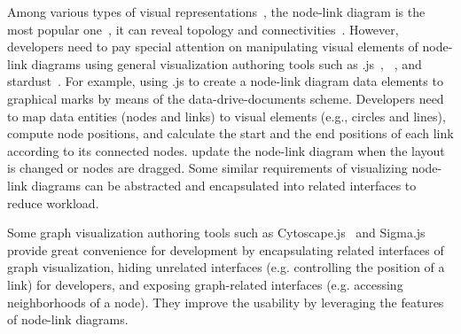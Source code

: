     Among various types of visual representations~\cite{DBLP:journals/tvcg/HermanMM00}, the node-link diagram is the most popular one~\cite{pan2020rcanalyzer},  it can reveal topology and connectivities~\cite{ghoniem2004comparison}.
    However, developers need to pay special attention on manipulating  visual elements of node-link diagrams using general visualization authoring tools such as .js~\cite{DBLP:journals/tvcg/BostockOH11}, ~\cite{p4,DBLP:journals/tvcg/LiM20,p6}, and stardust~\cite{DBLP:journals/cgf/RenLH17}.
    For example, using .js to create a node-link diagram  data elements to graphical marks by means of the data-drive-documents scheme. 
    Developers need to map data entities (nodes and links) to visual elements (e.g., circles and lines), compute node positions, and calculate the start and the end positions of each link according to its connected nodes.
     update the node-link diagram when the layout is changed\deleted[id=kg]{,} or  nodes are dragged.
    Some similar requirements of visualizing node-link diagrams can be abstracted and encapsulated into related interfaces to reduce workload.
    
    Some graph visualization authoring tools such as Cytoscape.js~\cite{DBLP:journals/bioinformatics/FranzLHDSB16} and Sigma.js~\cite{DBLP:journals/jossw/Coene18}\added[id=kg]{,} provide great convenience for development by encapsulating related interfaces of graph visualization, hiding unrelated interfaces (e.g. controlling the position of a link) for developers, and exposing graph-related interfaces (e.g. accessing neighborhoods of a node). They improve the usability by leveraging the features of node-link diagrams.

